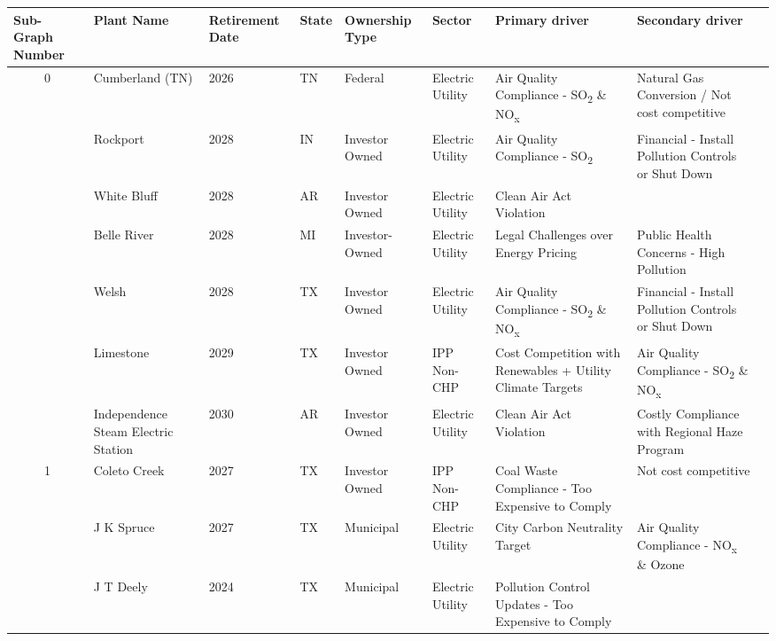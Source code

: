 \begin{table}[htb]
    \begin{minipage}{1\textwidth}
      \begin{adjustbox}{width=\textwidth}
          \begin{small}
              \begin{tabular}{cllllllll}
                  \multicolumn{1}{l}{\textbf{Sub-Graph Number}} & Plant Name & Retirement Date & State & Ownership Type & Sector & Primary driver & Secondary driver \\
                  \midrule
                  \multirow{7}{*}{0} & Cumberland (TN) & 2026 & TN & Federal & Electric Utility & Air Quality Compliance - SO\textsubscript{2} \& NO\textsubscript{x} & Natural Gas Conversion / Not cost competitive  \\
                  & Rockport & 2028 & IN & Investor Owned & Electric Utility & Air Quality Compliance - SO\textsubscript{2} & Financial - Install Pollution Controls or Shut Down \\
                  & White Bluff & 2028 & AR & Investor Owned & Electric Utility & Clean Air Act Violation & \\
                  & Belle River & 2028 & MI & Investor-Owned & Electric Utility & Legal Challenges over Energy Pricing & Public Health Concerns - High Pollution \\
                  & Welsh & 2028 & TX & Investor Owned & Electric Utility & Air Quality Compliance - SO\textsubscript{2} \& NO\textsubscript{x} & Financial - Install Pollution Controls or Shut Down \\
                  & Limestone & 2029 & TX & Investor Owned & IPP Non-CHP & Cost Competition with Renewables + Utility Climate Targets & Air Quality Compliance - SO\textsubscript{2} \& NO\textsubscript{x} \\
                  & Independence Steam Electric Station & 2030 & AR & Investor Owned & Electric Utility & Clean Air Act Violation & Costly Compliance with Regional Haze Program \\
                  \midrule
                  \multirow{4}{*}{1} & Coleto Creek & 2027 & TX & Investor Owned & IPP Non-CHP & Coal Waste Compliance - Too Expensive to Comply & Not cost competitive \\
                  & J K Spruce & 2027 & TX & Municipal & Electric Utility & City Carbon Neutrality Target & Air Quality Compliance - NO\textsubscript{x} \& Ozone \\
                  & J T Deely & 2024 & TX & Municipal & Electric Utility & Pollution Control Updates - Too Expensive to Comply &  \\

\end{tabular}
\end{small}
\end{adjustbox}
\end{minipage}
\end{table}
